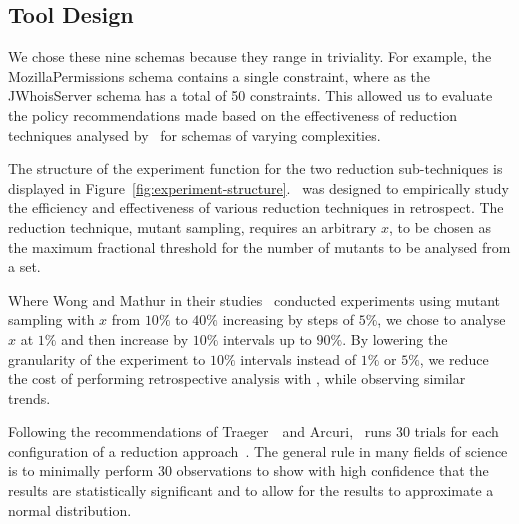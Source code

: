 \subsection{Tool Design}


We chose these nine schemas because they range in triviality. For example, the MozillaPermissions schema contains a
single constraint, where as the JWhoisServer schema has a total of 50 constraints. This allowed us to evaluate the
policy recommendations made based on the effectiveness of reduction techniques analysed by \mr~for schemas of varying
complexities.

The structure of the experiment function for the two reduction sub-techniques is displayed in
Figure~\ref{fig:experiment-structure}. \mr~was designed to empirically study the efficiency and effectiveness of various
reduction techniques in retrospect. The reduction technique, mutant sampling, requires an arbitrary $x$, to be chosen as
the maximum fractional threshold for the number of mutants to be analysed from a set.

Where Wong and Mathur in their studies~\cite{mathur1994empirical, wong1993mutation} conducted experiments using mutant
sampling with $x$ from $10\%$ to $40\%$ increasing by steps of $5\%$, we chose to analyse $x$ at $1\%$ and then increase
by $10\%$ intervals up to $90\%$. By lowering the granularity of the experiment to $10\%$ intervals instead of $1\%$ or
$5\%$, we reduce the cost of performing retrospective analysis with \mr, while observing similar trends.

Following the recommendations of Traeger~\etal~and Arcuri, \mr~runs 30 trials for each configuration of a reduction
approach~\cite{traeger2008nine, arcuri2014hitchhiker}. The general rule in many fields of science is to minimally
perform 30 observations to show with high confidence that the results are statistically significant and to allow for the
results to approximate a normal distribution.
